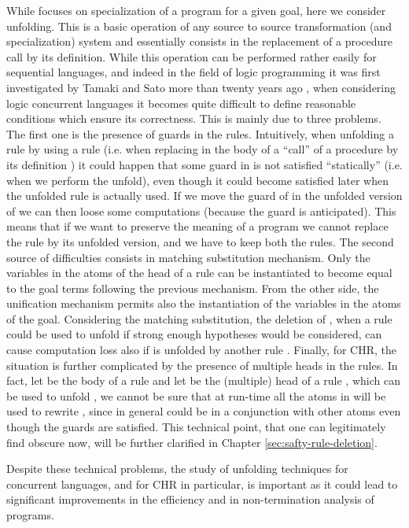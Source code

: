\documentclass[final]{acmtrans2e}
\begin{document}
While  \cite{Fru04}  focuses on specialization of a program for a
given  goal, here we consider unfolding.  This is a basic
operation of any source to source transformation (and
specialization) system and essentially consists in the replacement
of a procedure call by its definition. While this operation can be
performed rather easily for sequential languages, and indeed  in
the field of logic programming it was first investigated by Tamaki
and Sato more than twenty years ago \cite{TS84}, when considering
logic concurrent languages it becomes quite difficult to define
reasonable conditions which ensure its correctness. This is mainly
due to three problems. The first one is the presence of guards in the rules.
Intuitively, when
unfolding a rule  by using a rule  (i.e. when replacing in
the body of  a ``call'' of a procedure by its definition )
it could happen that some guard in  is not satisfied
``statically'' (i.e. when we perform the unfold), even though it
could become satisfied later when the unfolded rule is actually
used. If we move the guard of  in the unfolded version of 
we can then loose some computations (because the guard is
anticipated). This means that if we want to preserve the meaning
of a program we cannot replace the rule  by its unfolded
version, and we have to keep both the rules.
The second source of difficulties consists in matching substitution
mechanism. Only the variables in the atoms of the head of a rule
 can be instantiated to become equal to the goal terms following
the previous mechanism. From the other side, the unification mechanism
permits also the instantiation of the variables in the atoms of the
goal. Considering the matching substitution, the deletion of , when
a rule  could be used to unfold  if strong enough hypotheses
would be considered, can cause computation loss also if  is unfolded
by another rule . Finally, for CHR, the situation is further complicated by
the presence of multiple heads in the rules.
In fact, let  be the body of a rule  and let  be the (multiple)
head of a rule , which can be used to unfold , we cannot be sure
that at run-time all the atoms in  will be used to rewrite ,
since in general  could be in a conjunction with other atoms even
though the guards are satisfied. This technical point, that one can legitimately find
obscure now, will be further clarified in Chapter
\ref{sec:safty-rule-deletion}.

Despite these technical problems, the study of unfolding techniques
for concurrent languages, and for CHR in particular, is important
as it could lead to significant improvements in the efficiency and
in non-termination analysis of programs.
\end{document}
